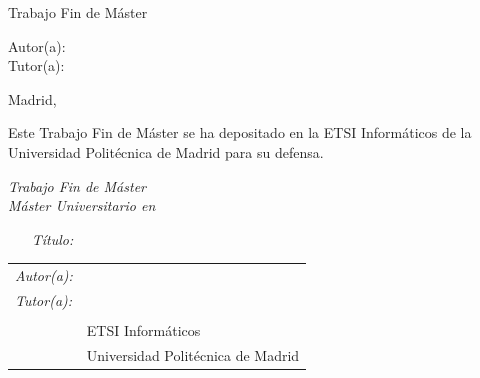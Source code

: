 \begin{titlepage}
\vspace*{1cm}
\begin{center}
\huge{ Trabajo Fin de Máster }
\end{center}

\vspace*{0.5cm}
\begin{center}
\huge\bfseries {  \TituloTFM{} } 
\end{center}

\vspace*{5cm}

\noindent
\large{Autor(a): \NombreAutor{} }\\
\large{Tutor(a): \NombreTutor{} }


\vspace*{4cm}
\begin{center}
Madrid, \Fecha
\end{center}

\newpage
\thispagestyle{empty}
\noindent
Este Trabajo Fin de Máster se ha depositado en la ETSI Informáticos de la Universidad Politécnica de Madrid para su defensa.

\vspace*{4cm}
\noindent
\textit{Trabajo Fin de Máster}\\
\textit{Máster Universitario en} \Master{}

\begin{enumerate}
\item[\textit{Título:}] \TituloTFM{}
\end{enumerate}
\Fecha


\vspace*{3cm}

\noindent
\begin{tabular}{ll}
\textit{Autor(a):} & \NombreAutor{}  \\ 
\textit{Tutor(a):} & \NombreTutor{}  \\ 
                & \Departamento{} \\
                & ETSI Informáticos\\
                & Universidad Politécnica de Madrid
\end{tabular} 

\end{titlepage}
